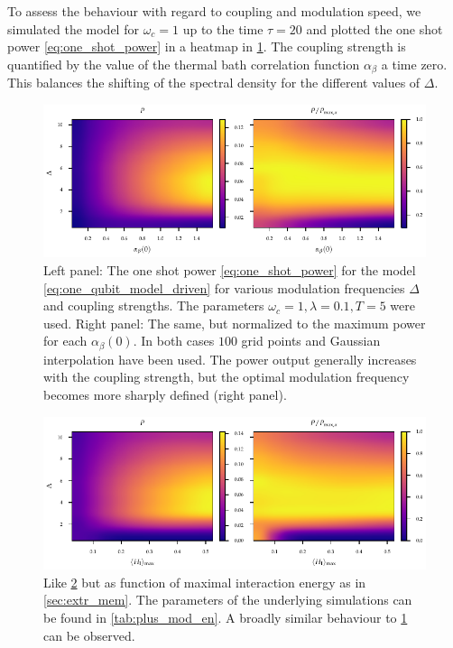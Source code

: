 To assess the behaviour with regard to coupling and modulation speed,
we simulated the model for \(ω_{c}=1\) up to the time \(τ=20\) and
plotted the one shot power \cref{eq:one_shot_power} in a heatmap in
\cref{fig:power_heatmap}. The coupling strength is quantified by the
value of the thermal bath correlation function \(α_{β}\) a time
zero. This balances the shifting of the spectral density for the
different values of \(Δ\).
\begin{figure}[htp]
  \centering
  \includegraphics{figs/one_bath_mod/power_heatmap}
  \caption{\label{fig:power_heatmap} Left panel: The one shot power
    \cref{eq:one_shot_power} for the model
    \cref{eq:one_qubit_model_driven} for various modulation
    frequencies \(Δ\) and coupling strengths. The parameters
    \(ω_{c}=1,λ=0.1, T=5\) were used. Right panel: The same, but
    normalized to the maximum power for each \(α_{β}(0)\). In both
    cases \(100\) grid points and Gaussian interpolation have been
    used. The power output generally increases with the coupling
    strength, but the optimal modulation frequency becomes more
    sharply defined (right panel).}
\end{figure}
\begin{figure}[htp]
  \centering
  \includegraphics{figs/one_bath_mod/power_en_heatmap}
  \caption{\label{fig:power_heatmap_tuned} Like
    \cref{fig:power_heatmap_tuned} but as function of maximal
    interaction energy as in \cref{sec:extr_mem}.  The parameters of
    the underlying simulations can be found in
    \cref{tab:plus_mod_en}. A broadly similar behaviour to
    \cref{fig:power_heatmap} can be observed.}
\end{figure}

